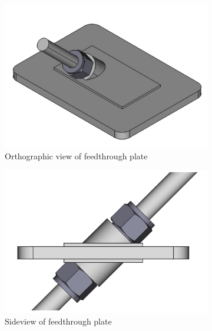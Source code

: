 \documentclass[11pt]{article}
\begin{document}
\begin{figure}
  \begin{center}
    \begin{subfigure}{0.3\textwidth}
      \includegraphics[width=\textwidth]{UmbilicalFeedthroughOrtho.pdf}
      \caption{Orthographic view of feedthrough plate}
      \label{fig:UFOrtho}
    \end{subfigure}
    \begin{subfigure}{0.3\textwidth}
      \includegraphics[width=\textwidth]{UmbilicalFeedthroughSideview.pdf}
      \caption{Sideview of feedthrough plate}
      \label{fig:UFSide}
    \end{subfigure}
    \begin{subfigure}{0.3\textwidth}

\end{subfigure}
\end{center}
\end{figure}
\end{document}
